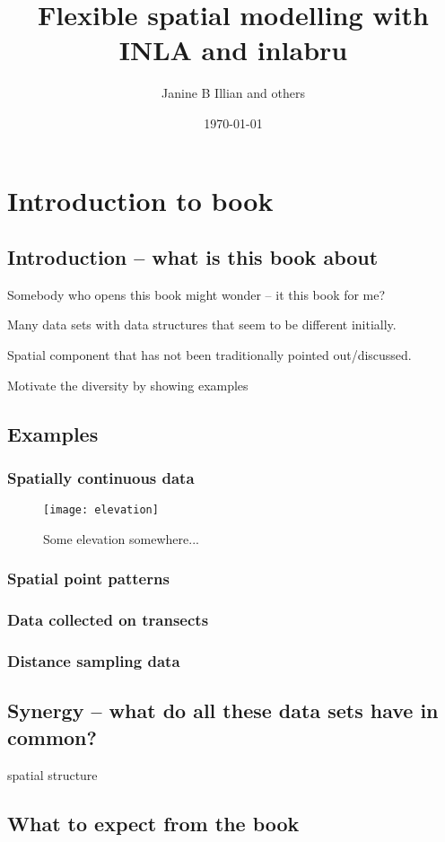 \documentclass[authoryear]{book}
\title{Flexible spatial modelling with INLA and inlabru}
\author{Janine B Illian and others }
\date{\today}
\theoremstyle{definition}
\begin{document}
\maketitle

\chapter{Introduction to book}

\section{Introduction -- what is this book about}
Somebody who opens this book might wonder -- it this book for me? 
  
Many data sets with data structures that seem to be different initially.

Spatial component that has not been traditionally pointed out/discussed.

Motivate the diversity by showing examples

\section{Examples}



\subsection{Spatially continuous data}

\begin{figure}
\centering
\texttt{[image: elevation]}
\caption{\label{fig:elev} Some elevation somewhere...}
\end{figure}




\subsection{Spatial point patterns}
\subsection{Data collected on transects}
\subsection{Distance sampling data}


\section{Synergy -- what do all these data sets have in common?  }

spatial structure

\section{What to expect from the book}
\end{document}
